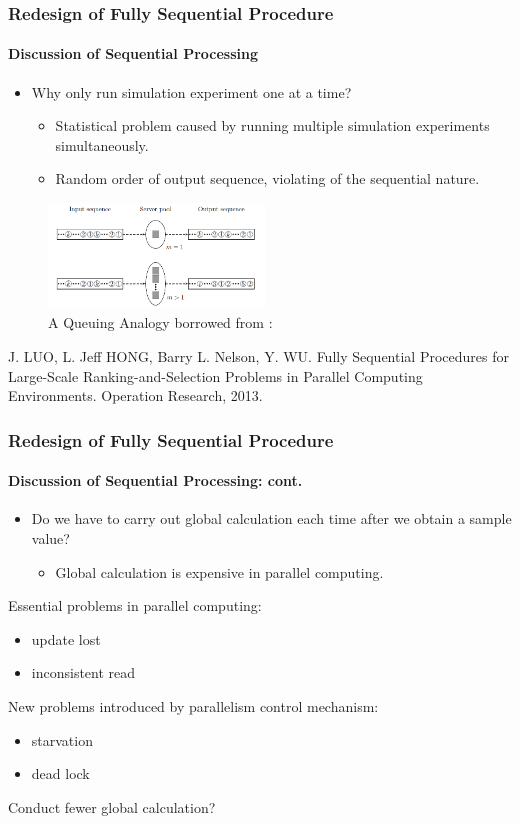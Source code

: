 \documentclass{beamer}
\begin{document}
\begin{frame}
\frametitle{Redesign of Fully Sequential Procedure}
\framesubtitle{Discussion of Sequential Processing}
\begin{itemize}
\item Why only run simulation experiment one at a time?
\begin{itemize}
\item Statistical problem caused by running multiple simulation experiments simultaneously.
\item Random order of output sequence, violating of the sequential nature.
\end{itemize}
\end{itemize}
\begin{figure}[ht]
\centering
\includegraphics[height=28mm]{queueing.png}
\caption{A Queuing Analogy borrowed from \cite{ras-seq-parallel}:}
\end{figure}
\tiny
{
\begin{thebibliography}{10}
 J. LUO, L. Jeff HONG, Barry L. Nelson, Y. WU. Fully Sequential Procedures for Large-Scale Ranking-and-Selection Problems in Parallel Computing Environments. Operation Research, 2013.
\end{thebibliography}
}
\end{frame}

\begin{frame}
\frametitle{Redesign of Fully Sequential Procedure}
\framesubtitle{Discussion of Sequential Processing: cont.}
\begin{itemize}
\item Do we have to carry out global calculation each time after we obtain a sample value?
\begin{itemize}
\item Global calculation is expensive in parallel computing.
\end{itemize}
\end{itemize}
Essential problems in parallel computing:
\begin{itemize}
\item update lost
\item inconsistent read
\end{itemize}
New problems introduced by parallelism control mechanism:
\begin{itemize}
\item starvation
\item dead lock
\end{itemize}
Conduct fewer global calculation?
\end{frame}
\end{document}
